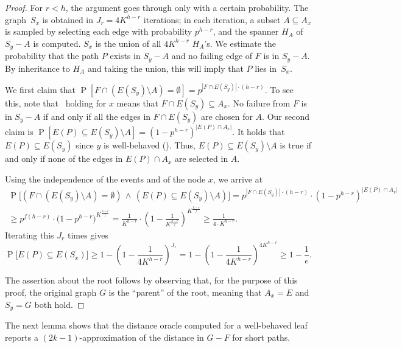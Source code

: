 \documentclass{article}\usepackage[a4paper,margin=20mm]{geometry}
\DeclareMathOperator{\Pb}{P}
\renewcommand{\ge}{\geqslant}
\begin{document}
\begin{proof}
  For $r < h$, the argument goes through only with a certain probability.
  The graph~$S_x$ is obtained in $J_r = 4 K^{h-r}$ iterations;
  in each iteration, a subset $A \subseteq A_x$ is sampled
  by selecting each edge with probability $p^{h-r}$,
  and the spanner $H_A$ of $S_y{-}A$ is computed.
  $S_x$ is the union of all $4 K^{h-r}$ $H_A$'s.
  We estimate the probability that the path 
  $P$ exists in $S_y{-}A$ 
  and no failing edge of $F$ is in $S_y{-}A$.
  By inheritance to $H_A$ and taking the union,
  this will imply that $P$ lies in~$S_x$.
  
  We first claim that $\Pb[F\cap (E(S_y){\setminus}A)=\emptyset] = p^{|F\cap E(S_y)| \cdot (h-r)}$.
  To see this, note that~ holding for $x$ means that $F\cap E(S_y)\subseteq A_x$.
  No failure from $F$ is in $S_y{-}A$ if and only if all the edges in $F\cap E(S_y)$
  are chosen for $A$. 
  Our second claim is $\Pb[E(P) \subseteq E(S_y){\setminus}A] = (1-p^{h-r})^{|E(P) \cap A_x|}$.
  It holds that $E(P)\subseteq E(S_y)$ since $y$ is well-behaved ().
  Thus, $E(P)\subseteq E(S_y){\setminus}A$ is true
  if and only if none of the edges in $E(P)\cap A_x$ are selected in $A$.
  
  Using the independence of the events and  of the node $x$,
  we arrive at
  \begin{multline*}
    \Pb\!\Big[ (F \cap (E(S_y){\setminus}A)=\emptyset) \,\wedge\,
      (E(P) \subseteq E(S_y){\setminus}A) \Big]
      = p^{|F\cap E(S_y)| \cdot (h-r)} \cdot (1-p^{h-r})^{|E(P) \cap A_x|}\\[-.33em]
      \ge  p^{f(h-r)} \cdot \Big(1-p^{h-r} \Big)^{K^{\frac{h-r}{f}}}
       =  \frac{1}{K^{h-r}} \cdot \left( 1-\frac{1}{K^{\frac{h-r}{f}}} \right)^{K^{\frac{h-r}{f}}}
      \ge \frac{1}{4 \cdot K^{h-r}}.
  \end{multline*}
  Iterating this $J_r$ times gives
  \begin{equation*}
    \Pb\!\big[E(P) \subseteq E(S_x)\big] 
      \ge 1-\left(1-\frac{1}{4K^{h-r}}\right)^{J_r}
      = 1-\left(1-\frac{1}{4K^{h-r}}\right)^{4K^{h-r}}
      \ge 1-\frac{1}{e}.
  \end{equation*}
  
  The assertion about the root follows
  by observing that, for the purpose of this proof, the original graph $G$ is the ``parent''
  of the root, meaning that $A_x = E$ and $S_y = G$ both hold.
\end{proof}

The next lemma shows that the distance oracle computed for a well-behaved leaf
reports a $(2k{-}1)$-approximation of the distance in $G-F$ for short paths. 
\end{document}
